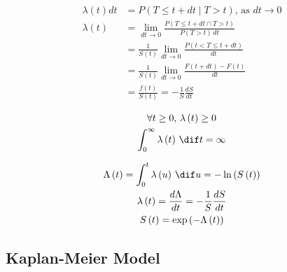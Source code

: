 \begin{subequations}\label{eq:Survival:hazard_def}
\begin{align}
\lambda\left(t\right) dt &= P\left(T \leq t + dt \mid T > t\right),\,\text{as} \,\, dt \to 0 \label{eq:Survival:hazard_def:a} \\
\lambda\left(t\right) &= \lim_{dt \to 0} \frac{P\left(T \leq t + dt \cap T > t\right)}{P\left(T > t\right)\,dt} \label{eq:Survival:hazard_def:b} \\
&= \frac{1}{S\left(t\right)} \lim_{dt \to 0} \frac{P\left(t < T \leq t + dt\right)}{dt} \label{eq:Survival:hazard_def:c} \\
&= \frac{1}{S\left(t\right)} \lim_{dt \to 0} \frac{F\left(t + dt\right) - F\left(t\right)}{dt} \label{eq:Survival:hazard_def:d} \\
&= \frac{f\left(t\right)}{S\left(t\right)} = -\frac{1}{S} \frac{dS}{dt} \label{eq:Survival:hazard_def:e}
\end{align}
\end{subequations}

\begin{subequations}\label{eq:Survival:hazard_cond}
\begin{gather}
\forall t \geq 0, \, \lambda\left(t\right) \geq 0 \label{eq:Survival:hazard_cond:a} \\
\int_{0}^{\infty} \lambda\left(t\right) \, \dif t = \infty \label{eq:Survival:hazard_cond:b}
\end{gather}
\end{subequations}

\begin{subequations}\label{eq:Survival:cum_hazard}
\begin{gather}
\Lambda\left(t\right) = \int_{0}^{t} \lambda\left(u\right) \, \dif u = - \ln\left(S\left(t\right)\right) \label{eq:Survival:cum_hazard:def} \\
\lambda\left(t\right) = \frac{d\Lambda}{dt} = -\frac{1}{S} \frac{dS}{dt} \label{eq:Survival:cum_hazard:to_lambda} \\
S\left(t\right) = \exp\left(-\Lambda\left(t\right)\right) \label{eq:Survival:cum_hazard:to_S}
\end{gather}
\end{subequations}

\subsection{Kaplan-Meier Model}
\label{additional:Survival:KM}

